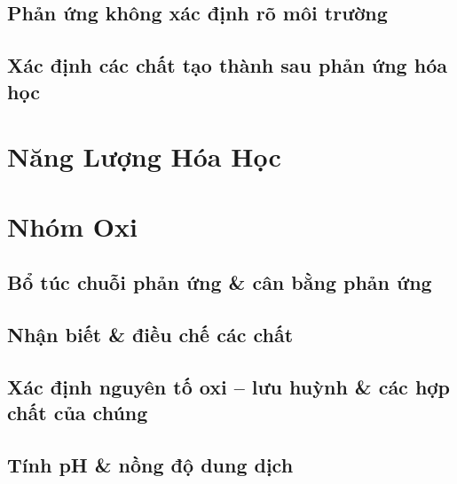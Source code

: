 \documentclass{article}
\numberwithin{equation}{section}
\begin{document}

\subsection{Phản ứng không xác định rõ môi trường}


\subsection{Xác định các chất tạo thành sau phản ứng hóa học}


\section{Năng Lượng Hóa Học}


\section{Nhóm Oxi}

\subsection{Bổ túc chuỗi phản ứng \& cân bằng phản ứng}


\subsection{Nhận biết \& điều chế các chất}


\subsection{Xác định nguyên tố oxi -- lưu huỳnh \& các hợp chất của chúng}


\subsection{Tính pH \& nồng độ dung dịch }
\end{document}
